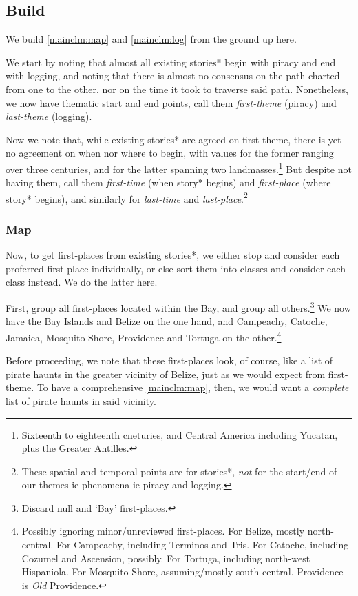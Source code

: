 \documentclass{amsart}
\newcommand{\mention}[1]{\textit{#1}}%
\theoremstyle{definition}
\theoremstyle{remark}
\begin{document}
	\subsection{Build}
		\label{ss:build}
		We build \ref{mainclm:map} and \ref{mainclm:log} from the ground up here.
		
		We start by noting that almost all existing stories* begin with piracy and end with logging, and noting that there is almost no consensus on the path charted from one to the other, nor on the time it took to traverse said path. Nonetheless, we now have thematic start and end points, call them \mention{first-theme} (piracy) and \mention{last-theme} (logging).
		
		Now we note that, while existing stories* are agreed on first-theme, there is yet no agreement on when nor where to begin, with values for the former ranging over three centuries, and for the latter spanning two landmasses.\footnote{Sixteenth to eighteenth cneturies, and Central America including Yucatan, plus the Greater Antilles.} But despite not having them, call them \mention{first-time} (when story* begins) and \mention{first-place} (where story* begins), and similarly for \mention{last-time} and \mention{last-place}.\footnote{These spatial and temporal points are for stories*, \emph{not} for the start/end of our themes ie phenomena ie piracy and logging.}
		\subsubsection{Map}
			\label{sss:map}
			Now, to get first-places from existing stories*, we either stop and consider each proferred first-place individually, or else sort them into classes and consider each class instead. We do the latter here.
		
			First, group all first-places located within the Bay, and group all others.\footnote{Discard null and `Bay' first-places.} We now have the Bay Islands and Belize on the one hand, and Campeachy, Catoche, Jamaica, Mosquito Shore, Providence and Tortuga on the other.\footnote{Possibly ignoring minor/unreviewed first-places. For Belize, mostly north-central. For Campeachy, including Terminos and Tris. For Catoche, including Cozumel and Ascension, possibly. For Tortuga, including north-west Hispaniola. For Mosquito Shore, assuming/mostly south-central. Providence is \emph{Old} Providence.}
		
			Before proceeding, we note that these first-places look, of course, like a list of pirate haunts in the greater vicinity of Belize, just as we would expect from first-theme. To have a comprehensive \ref{mainclm:map}, then, we would want a \emph{complete} list of pirate haunts in said vicinity.
		
\end{document}
